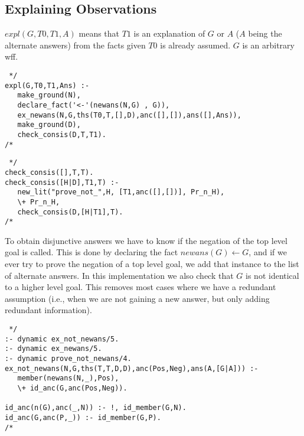 \subsection{Explaining Observations}
$expl(G,T0,T1,A)$ means that $T1$ is an explanation of $G$ or $A$ ($A$ being
the alternate answers) from the facts given $T0$ is already assumed.
$G$ is an arbitrary wff.
\begin{verbatim} */
expl(G,T0,T1,Ans) :-
   make_ground(N),
   declare_fact('<-'(newans(N,G) , G)),
   ex_newans(N,G,ths(T0,T,[],D),anc([],[]),ans([],Ans)),
   make_ground(D),
   check_consis(D,T,T1).
/* \end{verbatim}

\begin{verbatim} */
check_consis([],T,T).
check_consis([H|D],T1,T) :-
   new_lit("prove_not_",H, [T1,anc([],[])], Pr_n_H),
   \+ Pr_n_H,
   check_consis(D,[H|T1],T).
/* \end{verbatim}
To obtain disjunctive answers we have to know if the negation of the top
level goal is called. This is done by declaring the fact
$newans(G) \leftarrow G$, and if we ever try to
prove the negation of a top level goal, we add that instance to the
list of alternate answers. In this implementation we also check
that $G$ is not identical to a higher level goal. This removes most cases
where we have a redundant assumption (i.e., when we are not gaining a new
answer, but only adding redundant information).
\begin{verbatim} */
:- dynamic ex_not_newans/5.
:- dynamic ex_newans/5.
:- dynamic prove_not_newans/4.
ex_not_newans(N,G,ths(T,T,D,D),anc(Pos,Neg),ans(A,[G|A])) :-
   member(newans(N,_),Pos),
   \+ id_anc(G,anc(Pos,Neg)).

id_anc(n(G),anc(_,N)) :- !, id_member(G,N).
id_anc(G,anc(P,_)) :- id_member(G,P).
/* \end{verbatim}

